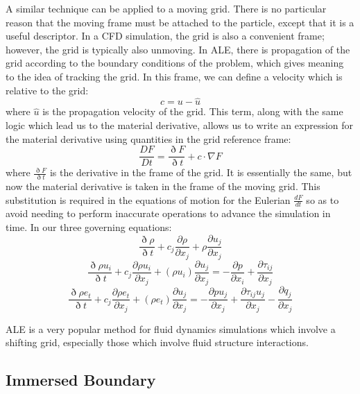 \documentclass{article}
\def\deriv#1#2{\frac{d #1}{d #2}}
\def\pp#1#2{\frac{\partial #1}{\partial #2}}
\begin{document}
A similar technique can be applied to a moving grid.  There is no particular reason that the moving frame must be attached to the particle, except that it is a useful descriptor.  In a CFD simulation, the grid is also a convenient frame; however, the grid is typically also unmoving.  In ALE, there is propagation of the grid according to the boundary conditions of the problem, which gives meaning to the idea of tracking the grid.  In this frame, we can define a velocity which is relative to the grid:
\begin{equation}
  c = u - \hat{u}
\end{equation}
where $\hat{u}$ is the propagation velocity of the grid.  This term, along with the same logic which lead us to the material derivative, allows us to write an expression for the material derivative using quantities in the grid reference frame:
\begin{equation}
  \frac{DF}{Dt} = \frac{\eth F}{\eth t} + c \cdot \nabla F
\end{equation}
where $\frac{\eth F}{\eth t}$ is the derivative in the frame of the grid.  It is essentially the same, but now the material derivative is taken in the frame of the moving grid.  This substitution is required in the equations of motion for the Eulerian $\deriv{F}{t}$ so as to avoid needing to perform inaccurate operations to advance the simulation in time.  In our three governing equations:
\begin{equation}
  \frac{\eth \rho}{\eth t} + c_j \pp{\rho}{x_j} + \rho \pp{u_j}{x_j}
\end{equation}
\begin{equation}
  \frac{\eth \rho u_i}{\eth t} + c_j \pp{\rho u_i}{x_j} + (\rho u_i)\pp{u_j}{x_j} = - \pp{p}{x_i} + \pp{\tau_{ij}}{x_j}
\end{equation}
\begin{equation}
  \frac{\eth \rho e_t}{\eth t} + c_j \pp{\rho e_t}{x_j} + (\rho e_t)\pp{u_j}{x_j} = - \pp{p u_j}{x_j} + \pp{\tau_{ij} u_j}{x_j}  - \pp{q_j}{x_j}
\end{equation}

ALE is a very popular method for fluid dynamics simulations which involve a shifting grid, especially those which involve fluid structure interactions.  

\subsection{Immersed Boundary}
\end{document}
